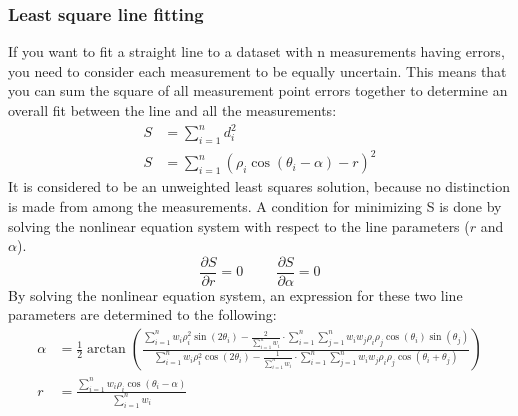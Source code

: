 \documentclass[../Main.tex]{subfiles}
\begin{document}
\subsubsection{Least square line fitting}
If you want to fit a straight line to a dataset with n measurements having errors, you need to consider each measurement to be equally uncertain. This means that you can sum the square of all measurement point errors together to determine an overall fit between the line and all the measurements:
\begin{align}
    S &= \sum_{i = 1}^{n}d_i^2 \\
    S &= \sum_{i = 1}^{n}\left(\rho_i\cos(\theta_i - \alpha) - r\right)^2
\end{align} 
It is considered to be an unweighted least squares solution, because no distinction is made from among the measurements. A condition for minimizing S is done by solving the nonlinear equation system with respect to the line parameters ($r$ and $\alpha$).
$$\frac{\partial S}{\partial r} = 0 \hspace{1cm} \frac{\partial S}{\partial \alpha} = 0$$
By solving the nonlinear equation system, an expression for these two line parameters are determined to the following:
\begin{align}
    \alpha &= \frac{1}{2}\arctan\left(\frac{\sum_{i = 1}^{n} w_i\rho_i^2 \sin(2\theta_i) - \frac{2}{\sum_{i = 1}^{n} w_i}\cdot\sum_{i = 1}^{n}\sum_{j = 1}^{n}w_{i}w_{j}\rho_{i}\rho_{j}\cos(\theta_i)\sin(\theta_j)}{\sum_{i = 1}^{n}w_i\rho_i^2\cos(2\theta_i) - \frac{1}{\sum_{i = 1}^{n} w_i}\cdot\sum_{i = 1}^{n}\sum_{j = 1}^{n}w_{i}w_{j}\rho_{i}\rho_{j}\cos(\theta_i + \theta_j)}\right) \\
    r &= \frac{\sum_{i = 1}^{n}w_i\rho_i\cos(\theta_i - \alpha)}{\sum_{i = 1}^{n}w_i}
\end{align}
\end{document}
